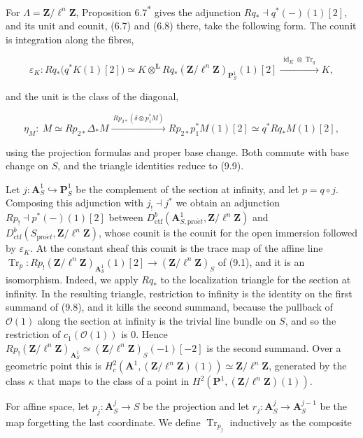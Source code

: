 \documentclass[11pt]{article}
\newcommand{\bpout}[1]{#1\textsuperscript{\hyperlink{bp-outside}{\ensuremath{\ast}}}}
\begin{document}
For \(\Lambda=\mathbf Z/\ell^n\mathbf Z\), Proposition \bpout{6.7} gives the adjunction \(Rq_*\dashv q^*(-)(1)[2]\), and its unit and counit, (6.7) and (6.8) there, take the following form. The counit is integration along the fibres,

\[
\varepsilon_K:Rq_*\bigl(q^{*}K(1)[2]\bigr)
\simeq K\otimes^{\mathbf L} Rq_*(\mathbf Z/\ell^n\mathbf Z)_{\mathbf P^1_S}(1)[2]
\xrightarrow{\ \operatorname{id}_K\otimes\operatorname{Tr}_q\ } K,
\tag{9.10}
\]

and the unit is the class of the diagonal,

\[
\eta_M:\ M\simeq Rp_{2*}\Delta_*M
\xrightarrow{\ Rp_{2*}(\delta\otimes p_1^*M)\ } Rp_{2*}p_{1}^{*}M(1)[2]
\simeq q^{*}Rq_*M(1)[2],
\]

using the projection formulas and proper base change. Both commute with base change on \(S\), and the triangle identities reduce to (9.9).

Let \(j:\mathbf A^1_S\hookrightarrow\mathbf P^1_S\) be the complement of the section at infinity, and let \(p=q\circ j\). Composing this adjunction with \(j_!\dashv j^*\) we obtain an adjunction \(Rp_!\dashv p^*(-)(1)[2]\) between \(D^b_{\mathrm{ctf}}(\mathbf A^1_{S,\mathrm{pro}\acute{e}t},\mathbf Z/\ell^n\mathbf Z)\) and \(D^b_{\mathrm{ctf}}(S_{\mathrm{pro}\acute{e}t},\mathbf Z/\ell^n\mathbf Z)\), whose counit is the counit for the open immersion followed by \(\varepsilon_K\). At the constant sheaf this counit is the trace map of the affine line \(\operatorname{Tr}_p:Rp_!(\mathbf Z/\ell^n\mathbf Z)_{\mathbf A^1_S}(1)[2]
\to(\mathbf Z/\ell^n\mathbf Z)_S\) of (9.1), and it is an isomorphism. Indeed, we apply \(Rq_*\) to the localization triangle for the section at infinity. In the resulting triangle, restriction to infinity is the identity on the first summand of (9.8), and it kills the second summand, because the pullback of \(\mathcal O(1)\) along the section at infinity is the trivial line bundle on \(S\), and so the restriction of \(c_1(\mathcal O(1))\) is \(0\). Hence \(Rp_!(\mathbf Z/\ell^n\mathbf Z)_{\mathbf A^1_S}\simeq
(\mathbf Z/\ell^n\mathbf Z)_S(-1)[-2]\) is the second summand. Over a geometric point this is \(H^2_c(\mathbf A^1,(\mathbf Z/\ell^n\mathbf Z)(1))\simeq
\mathbf Z/\ell^n\mathbf Z\), generated by the class \(\kappa\) that maps to the class of a point in \(H^2(\mathbf P^1,(\mathbf Z/\ell^n\mathbf Z)(1))\).

For affine space, let \(p_j:\mathbf A^j_S\to S\) be the projection and let \(r_j:\mathbf A^j_S\to\mathbf A^{j-1}_S\) be the map forgetting the last coordinate. We define \(\operatorname{Tr}_{p_j}\) inductively as the composite
\end{document}
